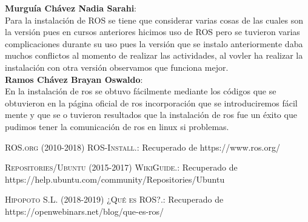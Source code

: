 \documentclass[letter,openrigth,12pt,spanish]{report}
\begin{document}
\textbf{Murgu\'ia Ch\'avez Nadia Sarahi}:\\
Para la instalaci\'on de ROS se tiene que considerar varias cosas de las cuales son la versi\'on pues en cursos anteriores hicimos uso de ROS pero se tuvieron varias complicaciones durante su uso pues la versi\'on que se instalo anteriormente daba muchos conflictos al momento de realizar las actividades, al vovler ha realizar la instalaci\'on con otra versi\'on observamos que funciona mejor.\\

\textbf{Ramos Ch\'avez Brayan Oswaldo}:\\
En la instalación de ros se obtuvo fácilmente mediante los códigos que se obtuvieron en la página oficial de ros incorporación que se introduciremos fácil mente y que se o tuvieron resultados que la instalación de ros fue un éxito que pudimos tener la comunicación de ros en linux si problemas.\\

\newpage

\begin{thebibliography}{X}

 \textsc{ROS.org} (2010-2018) \textsc{ROS-Install}.: Recuperado de https://www.ros.org/

 \textsc{Repositories/Ubuntu} (2015-2017) \textsc{WikiGuide}.: Recuperado de https://help.ubuntu.com/community/Repositories/Ubuntu

 \textsc{Hipopoto S.L.} (2018-2019) \textsc{¿Qu\'e es ROS?}.: Recuperado de https://openwebinars.net/blog/que-es-ros/

\end{thebibliography}
\end{document}
